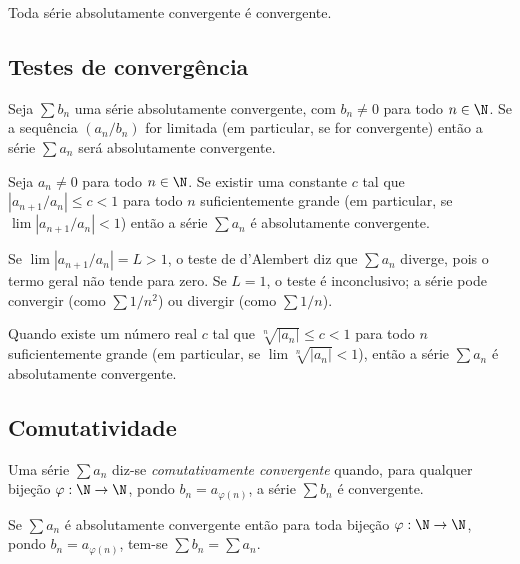 \documentclass{article}
\begin{document}
\begin{prop}
    Toda série absolutamente convergente é convergente.
\end{prop}

\subsection{Testes de convergência}

\begin{prop}
    Seja \(\sum b_n\) uma série absolutamente convergente, com \(b_n \neq 0\) para todo \(n \in \N\). Se a sequência \((a_n/b_n)\) for limitada (em particular, se for convergente) então a série \(\sum a_n\) será absolutamente convergente.
\end{prop}

\begin{cor} 
    Seja \(a_n \neq 0\) para todo \(n \in \N\). Se existir uma constante \(c\) tal que \(|a_{n+1}/a_n| \leq c < 1\) para todo \(n\) suficientemente grande (em particular, se \(\lim |a_{n+1}/a_n| < 1\)) então a série \(\sum a_n\) é absolutamente convergente.
\end{cor}

\begin{rem}
    Se \(\lim |a_{n+1}/a_n| = L > 1\), o teste de d'Alembert diz que \(\sum a_n\) diverge, pois o termo geral não tende para zero. Se \(L = 1\), o teste é inconclusivo; a série pode convergir (como \(\sum 1/n^2\)) ou divergir (como \(\sum 1/n\)).
\end{rem}

\begin{thm} 
    Quando existe um número real \(c\) tal que \(\sqrt[n]{|a_n|} \leq c < 1\) para todo \(n\) suficientemente grande (em particular, se \(\lim \sqrt[n]{|a_n|} < 1\)), então a série \(\sum a_n\) é absolutamente convergente.
\end{thm}

\subsection{Comutatividade}

\begin{defn}
    Uma série \(\sum a_n\) diz-se \emph{comutativamente convergente} quando, para qualquer bijeção \(\varphi: \N \to \N\), pondo \(b_n = a_{\varphi(n)}\), a série \(\sum b_n\) é convergente.
\end{defn}

\begin{prop}
    Se \(\sum a_n\) é absolutamente convergente então para toda bijeção \(\varphi: \N \to \N\), pondo \(b_n = a_{\varphi(n)}\), tem-se \(\sum b_n = \sum a_n\).
\end{prop}
\end{document}
